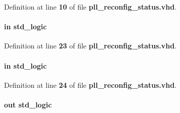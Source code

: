 Definition at line {\bf 10} of file {\bf pll\+\_\+reconfig\+\_\+status.\+vhd}.

\paragraph[{ps\+\_\+en}]{ {\bfseries \textcolor{keywordflow}{in}\textcolor{vhdlchar}{ }} {\bfseries \textcolor{comment}{std\+\_\+logic}\textcolor{vhdlchar}{ }} \hspace{0.3cm}{\ttfamily [Port]}}\label{classpll__reconfig__status_aeb651745c857c378319a569e1aa0ffb1}


Definition at line {\bf 23} of file {\bf pll\+\_\+reconfig\+\_\+status.\+vhd}.

\paragraph[{ps\+\_\+status}]{ {\bfseries \textcolor{keywordflow}{in}\textcolor{vhdlchar}{ }} {\bfseries \textcolor{comment}{std\+\_\+logic}\textcolor{vhdlchar}{ }} \hspace{0.3cm}{\ttfamily [Port]}}\label{classpll__reconfig__status_a43fec16cc52165e73a54ccd8ad738908}


Definition at line {\bf 24} of file {\bf pll\+\_\+reconfig\+\_\+status.\+vhd}.

\paragraph[{rcfig\+\_\+complete}]{ {\bfseries \textcolor{keywordflow}{out}\textcolor{vhdlchar}{ }} {\bfseries \textcolor{comment}{std\+\_\+logic}\textcolor{vhdlchar}{ }} \hspace{0.3cm}{\ttfamily [Port]}}\label{classpll__reconfig__status_a865e1006f2769bc2b467035daf4da3a9}


